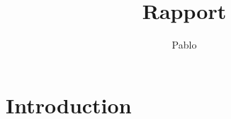\documentclass{report}
\begin{document}
\onehalfspacing
\title{Rapport}
\author{Pablo }
\maketitle

\section{Introduction}
\end{document}
